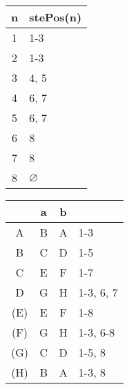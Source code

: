 \documentclass[11pt,a4paper]{report}
\begin{document}
\begin{tabular} {| c | l |}
\hline
n & stePos(n) \\ \hline
1 & 1-3 \\ \hline
2 & 1-3 \\ \hline
3 & 4, 5 \\ \hline
4 & 6, 7 \\ \hline
5 & 6, 7 \\ \hline
6 & 8 \\ \hline
7 & 8 \\ \hline
8 & $\varnothing$ \\ \hline
\end{tabular}
\quad
\begin{tabular} {| c | c |c | l |}
\hline 
& a & b & \\ \hline
A & B & A & 1-3\\ \hline
B & C & D & 1-5\\ \hline
C & E & F & 1-7\\ \hline
D & G & H & 1-3, 6, 7\\ \hline
(E) & E & F & 1-8\\ \hline
(F) & G & H & 1-3, 6-8\\ \hline
(G) & C & D & 1-5, 8\\ \hline
(H) & B & A & 1-3, 8\\ \hline
\end{tabular}
\end{document}

